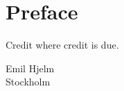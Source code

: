 \chapter*{Preface}
Credit where credit is due.

\begin{flushright}Emil Hjelm \\ Stockholm \end{flushright}
